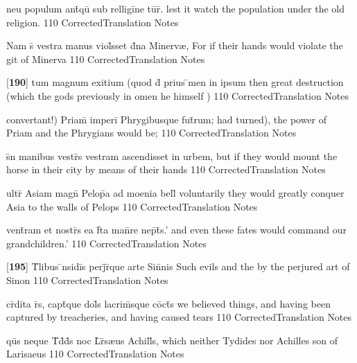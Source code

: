 \latline
  {neu populum ant\={\macron {\i}}qu\={} sub relligi\={}ne tu\={}r\={\macron {\i}}.}
  { lest it watch the population under the old religion. }
  {110}
  { CorrectedTranslation }
  { Notes }


\latline
  {Nam s\={\macron {\i}} vestra manus viol\={}sset d\={}na Minerv{\ae},}
  { For if their hands would violate the git of Minerva }
  {110}
  { CorrectedTranslation }
  { Notes }


\latline
  {[\textbf{190}] tum magnum exitium (quod d\={\macron {\i}} prius \={}men in ipsum}
  { then great destruction (which the gods previously in omen he himself ) }
  {110}
  { CorrectedTranslation }
  { Notes }


\latline
  {convertant!) Priam\={\macron {\i}} imperi\={} Phrygibusque fut\={}rum;}
  { had turned), the power of Priam and the Phrygians would be; }
  {110}
  { CorrectedTranslation }
  { Notes }


\latline
  {s\={\macron {\i}}n manibus vestr\={\macron {\i}}s vestram ascendisset in urbem,}
  { but if they would mount the horse in their city by means of their hands }
  {110}
  { CorrectedTranslation }
  { Notes }


\latline
  {ultr\={} Asiam magn\={} Pelop\={}a ad moenia bell\={}}
  { voluntarily they would greatly conquer Asia to the walls of Pelops   }
  {110}
  { CorrectedTranslation }
  { Notes }


\latline
  {vent\={}ram et nostr\={}s ea f\={}ta man\={}re nep\={}t\={}s.'}
  { and even these fates would command our grandchildren.'  }
  {110}
  { CorrectedTranslation }
  { Notes }


\latline
  {[\textbf{195}] T\={}libus \={\macron {\i}}nsidi\={\macron {\i}}s perj\={}r\={\macron {\i}}que arte Sin\={}nis}
  { Such evils and the by the perjured art of Sinon }
  {110}
  { CorrectedTranslation }
  { Notes }


\latline
  {cr\={}dita r\={}s, capt\={\macron {\i}}que dol\={\macron {\i}}s lacrim\={\macron {\i}}sque co\={}ct\={\macron {\i}}s}
  { we believed things, and having been captured by treacheries, and having caused tears }
  {110}
  { CorrectedTranslation }
  { Notes }


\latline
  {qu\={}s neque T\={}d\={\macron {\i}}d\={}s noc L\={}r\={\macron {\i}}s{\ae}us Achill\={}s,}
  { which neither Tydides nor Achilles son of Larisaeus }
  {110}
  { CorrectedTranslation }
  { Notes }


